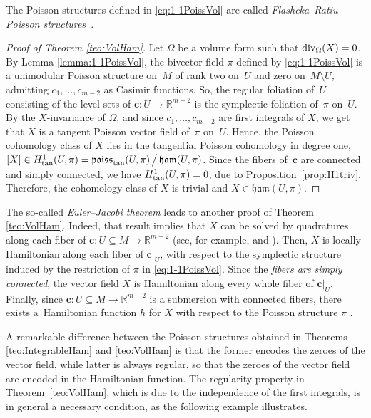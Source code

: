 \documentclass[10pt,a4paper]{amsart}
\newcommand{\R}[1]{\mathbb{R}^{#1}}
\numberwithin{equation}{section}
\begin{document}
\begin{Remark}
The Poisson structures defined in \eqref{eq:1-1PoissVol} are called \emph{Flashcka--Ratiu Poisson structures}~\cite{Damianou-2012}.
\end{Remark}

\begin{proof}[Proof of Theorem \ref{teo:VolHam}]
Let $\Omega$ be a volume form such that ${\rm div}_{\Omega}(X)=0$. By Lemma \ref{lemma:1-1PoissVol}, the bivector field $\pi$ defined by \eqref{eq:1-1PoissVol} is a unimodular Poisson structure on~$M$ of rank two on~$U$ and zero on~$M \setminus U$, admitting $c_1,\dots,c_{m-2}$ as Casimir functions. So, the regular foliation of~$U$ consisting of the level sets of $\boldsymbol{c}\colon U \to \R{m-2}$ is the symplectic foliation of~$\pi$ on~$U$. By the $X$-invariance of $\Omega$, and since $c_1,\dots,c_{m-2}$ are first integrals of $X$, we get that $X$ is a tangent Poisson vector field of~$\pi$ on~$U$. Hence, the Poisson cohomology class of $X$ lies in the tangential Poisson cohomology in degree one, $[X] \in H^{1}_{{\rm tan}}(U,\pi) = {\mathfrak{poiss}_{{\rm tan}}(U,\pi)} \,\big/\, {\mathfrak{ham}(U,\pi)}$. Since the fibers of~$\boldsymbol{c}$ are connected and simply connected, we have $H^{1}_{{\rm tan}}(U,\pi)=0$, due to Proposition~\ref{prop:H1triv}. Therefore, the cohomology class of $X$ is trivial and $X\in\mathfrak{ham}(U,\pi)$.
\end{proof}

\begin{Remark}
The so-called \emph{Euler--Jacobi theorem} leads to another proof of Theorem \ref{teo:VolHam}. Indeed, that result implies that $X$ can be solved by quadratures along each fiber of $\boldsymbol{c}\colon U \subseteq M \to \R{m-2}$ (see, for example, \cite{BBM-11} and \cite[Theorem 1]{Kozlov-85}). Then, $X$ is locally Hamiltonian along each fiber of $\boldsymbol{c}|_{U}$, with respect to the symplectic structure induced by the restriction of $\pi$ in \eqref{eq:1-1PoissVol}. Since the \emph{fibers are simply connected}, the vector field $X$ is Hamiltonian along every whole fiber of $\boldsymbol{c}|_{U}$. Finally, since $\boldsymbol{c}\colon U\subseteq M \to \R{m-2}$ is a submersion with connected fibers, there exists a~Hamiltonian function $h$ for $X$ with respect to the Poisson structure $\pi$ \cite[Proposition~7.4]{DazHec-91}.
\end{Remark}

A remarkable difference between the Poisson structures obtained in Theorems \ref{teo:IntegrableHam} and \ref{teo:VolHam} is that the former encodes the zeroes of the vector field, while latter is always regular, so that the zeroes of the vector field are encoded in the Hamiltonian function. The regularity property in Theorem~\ref{teo:VolHam}, which is due to the independence of the first integrals, is in general a necessary condition, as the following example illustrates.
\end{document}
